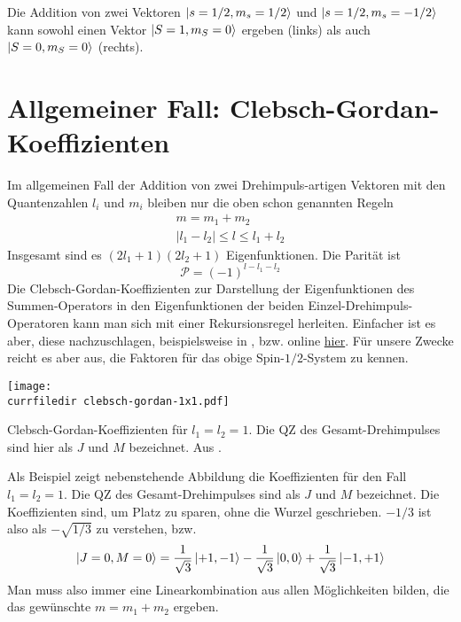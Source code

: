 \begin{marginfigure}

\caption{Die Addition von zwei Vektoren $\ket{s=1/2, m_s = 1/2}$ und  $\ket{s=1/2, m_s = -1/2}$ kann sowohl einen Vektor   $\ket{S=1, m_S = 0}$ ergeben (links) als auch $\ket{S=0, m_S = 0}$ (rechts).}
\end{marginfigure}




\section{Allgemeiner Fall: Clebsch-Gordan-Koeffizienten}

Im allgemeinen Fall der Addition von zwei Drehimpuls-artigen Vektoren mit den Quantenzahlen $l_i$ und $m_i$ bleiben nur die oben schon genannten Regeln
\begin{align}
   m =  m_1 + m_2 \\
   |l_1 - l_2 | \le l \le l_1 + l_2
\end{align}
Insgesamt sind es $(2 l_1 + 1) (2 l_2 +1)$ Eigenfunktionen. Die Parität ist
\begin{equation}
\mathcal{P} = (-1)^{l - l_1 - l_2}
\end{equation}
Die Clebsch-Gordan-Koeffizienten zur Darstellung der Eigenfunktionen des Summen-Operators in den Eigenfunktionen der beiden Einzel-Drehimpuls-Operatoren kann man sich mit einer Rekursionsregel herleiten. Einfacher ist es aber, diese nachzuschlagen, beispielsweise in \cite{ParticleDataGroup20}, bzw. online \href{ https://pdg.lbl.gov/2020/reviews/rpp2020-rev-clebsch-gordan-coefs.pdf}{hier}.
 Für unsere Zwecke reicht es aber aus, die Faktoren für das obige Spin-$1/2$-System zu kennen.

\begin{marginfigure}
\texttt{[image: \\currfiledir clebsch-gordan-1x1.pdf]}
\caption{Clebsch-Gordan-Koeffizienten für $l_1 = l_2 = 1$. Die QZ des Gesamt-Drehimpulses sind hier als $J$ und $M$ bezeichnet. Aus \cite{ParticleDataGroup20}.}
\end{marginfigure}

Als Beispiel zeigt nebenstehende Abbildung die Koeffizienten für den Fall $l_1 = l_2 = 1$. Die QZ des Gesamt-Drehimpulses sind  als $J$ und $M$ bezeichnet. Die Koeffizienten sind, um Platz zu sparen, ohne die Wurzel geschrieben. $-1/3$ ist also als $-\sqrt{1/3}$ zu verstehen, bzw.
\begin{equation}
\ket{J = 0, M= 0} = \frac{1}{\sqrt{3}} \ket{+1, -1} - \frac{1}{\sqrt{3}} \ket{0,0} + \frac{1}{\sqrt{3}} \ket{-1, +1} 
\end{equation}
Man muss also immer eine Linearkombination aus allen Möglichkeiten bilden, die das gewünschte $  m =  m_1 + m_2 $ ergeben.



\printbibliography[segment=\therefsegment,heading=subbibliography]

